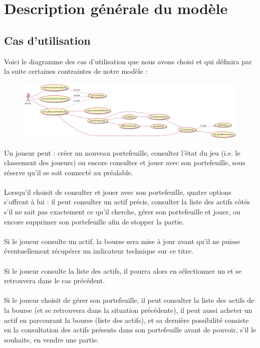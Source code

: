 \section{Description générale du modèle}

\subsection{Cas d'utilisation}
Voici le diagramme des cas d'utilisation que nous avons choisi et qui définira par la suite certaines contraintes de notre modèle :\\

\begin{figure}[H]
  \center
  \includegraphics[scale=0.35]{../graph/CasDutilisationGeneral.png} 
\end{figure}

Un joueur peut : créer un nouveau portefeuille, consulter l'état du jeu (i.e. le classement des joueurs) ou encore consulter et jouer avec son portefeuille, sous réserve qu'il se soit connecté au préalable. \\ \\
Lorsqu'il choisit de consulter et jouer avec son portefeuille, quatre options s'offrent à lui : il peut consulter un actif précis, consulter la liste des actifs côtés s'il ne sait pas exactement ce qu'il cherche, gérer son portefeuille et jouer, ou encore supprimer son portefeuille afin de stopper la partie. \\ \\
Si le joueur consulte un actif, la bourse sera mise à jour avant qu'il ne puisse éventuellement récupérer un indicateur technique sur ce titre.\\ \\
Si le joueur consulte la liste des actifs, il pourra alors en sélectionner un et se retrouvera dans le cas précédent. \\ \\
Si le joueur choisit de gérer son portefeuille, il peut consulter la liste des actifs de la bourse (et se retrouvera dans la situation précédente), il peut aussi acheter un actif en parcourant la bourse (liste des actifs), et sa dernière possibilité consiste en la consultation des actifs présents dans son portefeuille avant de pouvoir, s'il le souhaite, en vendre une partie.
